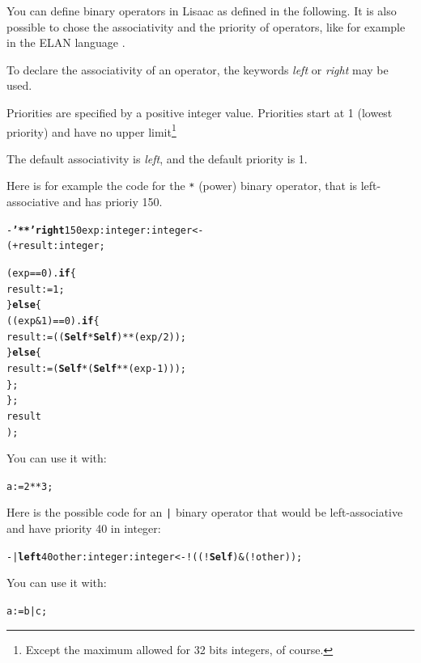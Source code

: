 \documentclass[11pt]{mybook}
\begin{document}
You can define binary operators in Lisaac as defined in the following.
It is also possible to chose the associativity 
and the priority of operators, like for example in the ELAN language
\cite{ELAN}.  

To declare the associativity of an operator, the keywords {\it{}left}
or {\it{}right} may be used.

Priorities are specified by a positive integer value.
Priorities start at  1 (lowest priority) and have no
upper limit\footnote{Except the maximum allowed for 32 bits integers, of course.}

The default associativity is {\it{}left}, and the default 
priority is 1.

Here is for example the code for the {\tt **} (power) binary operator, that
is  left-associative and has prioriy 150.
\begin{alltt}
    - {\bf{}'**' right} 150 exp:{\sc{}integer} :{\sc{}integer} <-
      ( + result:{\sc{}integer};

        (exp == 0).{\bf{}if} \{
          result := 1;
        \} {\bf{}else} \{
          ((exp & 1) == 0).{\bf{}if} \{
            result := (({\bf{}Self} * {\bf{}Self}) ** (exp / 2));
          \} {\bf{}else} \{
            result := ({\bf{}Self} * ({\bf{}Self} ** (exp-1)));
          \};
        \};
        result
      );
\end{alltt}

You can use it with:
\begin{alltt}
    a := 2 ** 3;
\end{alltt}

Here is the possible code for an {\tt{}|} binary operator that would be
left-associative and have priority 40 in {\sc{}integer}:
\begin{alltt}
    - | {\bf{}left} 40 other:{\sc{}integer} :{\sc{}integer} <- !((!{\bf{}Self}) & (!other));
\end{alltt}

You can use it with:
\begin{alltt}
    a := b | c;
\end{alltt}
\end{document}
